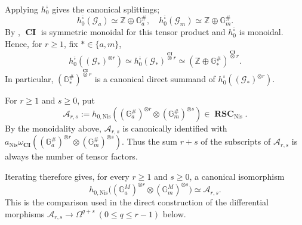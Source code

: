 \documentclass[a4paper,12pt,reqno]{amsart}
\numberwithin{equation}{section}
\theoremstyle{definition}
\newcommand{\Z}{\mathbb{Z}}
\newcommand{\bcube}{{\overline{\square}}}
\newcommand{\RSC}{{\operatorname{\mathbf{RSC}}}}
\newcommand{\CI}{\operatorname{\mathbf{CI}}}
\newcommand{\Acal}{\mathcal{A}}
\newcommand{\GaMod}{\mathbb{G}_{a}^{M}}
\newcommand{\GmMod}{\mathbb G_m^M}
\newcommand{\GaSharp}{\mathbb{G}_{a}^{\#}}
\newcommand{\GmSharp}{\mathbb G_m^{\#}}
\newcommand{\Nis}{\mathrm{Nis}}
\newcommand{\Gapair}{\mathcal{G}_a}
\newcommand{\Gmpair}{\mathcal{G}_m}
\begin{document}
Applying $h_0^{\bcube}$ gives the canonical splittings;
\begin{equation}\label{eq:splitGaGm}
 h_0^{\bcube}(\Gapair)\simeq \Z\oplus\GaSharp,
 \quad 
 h_0^{\bcube}(\Gmpair)\simeq \Z\oplus\GmSharp.
\end{equation}
By \cite[Remark~3.8]{RSY22}, $\CI$ is symmetric monoidal for this
tensor product and $h_0^{\bcube}$ is monoidal.  Hence, for $r\geq1$, fix $*\in\{a,m\}$,
\begin{equation}\label{eq:monGa}
 h_0^{\bcube}((\mathcal{G}_*)^{\otimes r})
 \simeq
 h_0^{\bcube}(\mathcal{G}_*)^{\overset{\CI}{\otimes} r}
 \simeq
 (\Z\oplus \mathbb{G}_*^{\#})^{\overset{\CI}{\otimes} r}.
\end{equation}
In particular, $(\mathbb{G}_*^{\#})^{\overset{\CI}{\otimes}r}$ is a canonical direct
summand of $h_0^{\bcube}((\mathcal{G}_*)^{\otimes r})$.


For $r\geq1$ and $s\geq0$, put
\begin{equation}\label{eq:Ars}
 \Acal_{r,s}:=
 h_{0,\Nis}\left(
 (\GaSharp)^{\otimes r}\otimes(\GmSharp)^{\otimes s}
 \right)\in \RSC_{\Nis}.
\end{equation}
By the monoidality above, $\Acal_{r,s}$ is canonically identified with
$a_{\Nis}\omega_{\CI}((\GaSharp)^{\otimes r}\otimes(\GmSharp)^{\otimes s})$.  Thus the sum $r+s$ of the subscripts
of $\Acal_{r,s}$ is always the number of tensor factors.


Iterating
\cite[Lemma~3.9]{RSY22} therefore gives, for every $r\geq1$ and $s\ge 0$, a canonical
isomorphism
\begin{equation}\label{eq:GaM0Ar}
 h_{0,\Nis}\bigl((\GaMod)^{\otimes r}\otimes (\GmMod)^{\otimes s}\bigr)
 \simeq \Acal_{r,s}.
\end{equation}
This is the comparison used in the direct construction of the differential
morphisms $\Acal_{r,s}\to \Omega^{q+s}\ (0\le q\le r-1)$ below.
\end{document}
